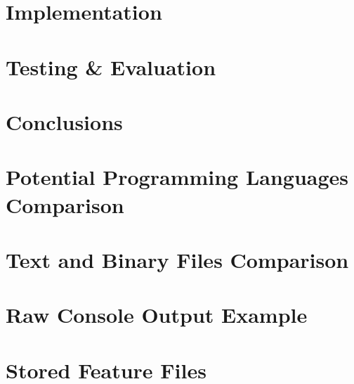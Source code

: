 \documentclass[11pt,openright,twoside,a4paper]{report}
\begin{document}
\chapter{Implementation}
\label{ch:chapter5}


\chapter{Testing \& Evaluation}
\label{ch:chapter6}


\chapter{Conclusions}
\label{ch:chapter7}




\let\cleardoublepage\clearpage %
\appendix

\chapter{Potential Programming Languages Comparison}
\label{ch:appendix-comparison-programming-languages}


\chapter{Text and Binary Files Comparison}
\label{ch:appendix-comparison-text-vs-binary}


\chapter{Raw Console Output Example}
\label{ch:appendix-raw-console-output-example}


\chapter{Stored Feature Files}
\label{ch:appendix-stored-feature-files}

\end{document}
